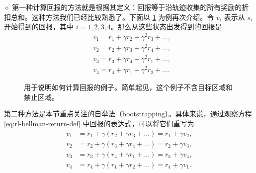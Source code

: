 \medskip
$\diamond$ 第一种计算回报的方法就是根据其定义：回报等于沿轨迹收集的所有奖励的折扣总和。这种方法我们已经比较熟悉了。下面以 \cref{fig:rl-bellman-return-cycle} 为例再次介绍。令 $v_i$ 表示从 $s_i$ 开始得到的回报，其中 $i=1,2,3,4$。那么从这些状态出发得到的回报是
\begin{equation}
\begin{aligned}
& v_1 = r_1 + \gamma r_2 + \gamma^2 r_3 + \dots , \\
& v_2 = r_2 + \gamma r_3 + \gamma^2 r_4 + \dots , \\
& v_3 = r_3 + \gamma r_4 + \gamma^2 r_1 + \dots , \\
& v_4 = r_4 + \gamma r_1 + \gamma^2 r_2 + \dots .
\end{aligned}
\label{eq:rl-bellman-return-def}
\end{equation}

\begin{figure}[ht]
\centering
{}
\caption{用于说明如何计算回报的例子。简单起见，这个例子不含目标区域和禁止区域。}
\label{fig:rl-bellman-return-cycle}
\end{figure}

第二种方法是本节重点关注的自举法（bootstrapping）。具体来说，通过观察方程 \cref{eq:rl-bellman-return-def} 中回报的表达式，可以将它们重写为
\begin{equation}
\begin{aligned}
v_1 &= r_1 + \gamma (r_2 + \gamma r_3 + \ldots) = r_1 + \gamma v_2, \\
v_2 &= r_2 + \gamma (r_3 + \gamma r_4 + \ldots) = r_2 + \gamma v_3, \\
v_3 &= r_3 + \gamma (r_4 + \gamma r_1 + \ldots) = r_3 + \gamma v_4, \\
v_4 &= r_4 + \gamma (r_1 + \gamma r_2 + \ldots) = r_4 + \gamma v_1.
\end{aligned}
\label{eq:rl-bellman-bootstrap}
\end{equation}

